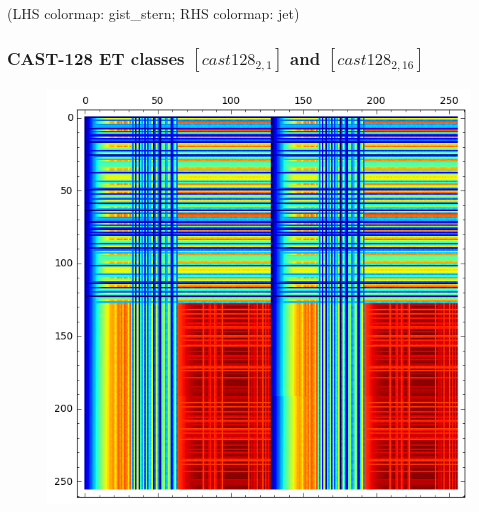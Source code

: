 \documentclass[pdf,sprung,slideColor,nocolorBG]{beamer}
\newenvironment{colortheme}[1]{
\def\ProvidesPackageRCS $##1${\relax}
\renewcommand{\ProcessOptions}{\relax}
\makeatletter

\makeatother
}{}
\newcommand{\slidecite}[1]{\tiny{(#1)}\normalsize{}}
\begin{document}
\begin{colortheme}{jubata}
\begin{frame}
\begin{figure}
\begin{minipage}{.48\textwidth}
  \label{fig:cast128_1_0_bent_cayley_graph_index_matrix}
\end{minipage}%
\end{figure}
\slidecite{LHS colormap: gist\_stern; RHS colormap: jet}
\end{frame}

\begin{frame}
\frametitle{CAST-128 ET classes $[cast128_{2,1}]$ and $[cast128_{2,16}]$}
\begin{figure}
\centering
\begin{minipage}{.48\textwidth}
  \centering
\includegraphics[width=.9\linewidth]{../matrix_plot/cast128_2_1_bent_cayley_graph_index_matrix.png}
  \label{fig:cast128_2_1_bent_cayley_graph_index_matrix}
\end{minipage}%
\begin{minipage}{.48\textwidth}
  \centering

\end{minipage}
\end{figure}
\end{frame}
\end{colortheme}
\end{document}
